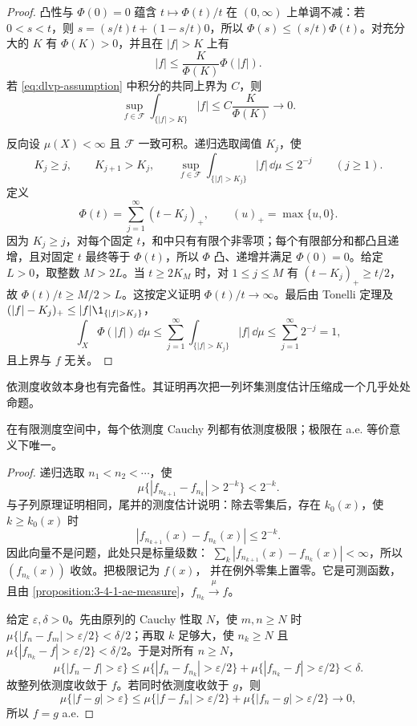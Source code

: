 \begin{proof}
凸性与 $\Phi(0)=0$ 蕴含 $t\mapsto\Phi(t)/t$ 在 $(0,\infty)$ 上单调不减：若
$0<s<t$，则 $s=(s/t)t+(1-s/t)0$，所以
$\Phi(s)\le(s/t)\Phi(t)$。对充分大的 $K$ 有 $\Phi(K)>0$，并且在 $|f|>K$ 上有
\[
  |f|\le \frac{K}{\Phi(K)}\Phi(|f|).
\]
若 \eqref{eq:dlvp-assumption} 中积分的共同上界为 $C$，则
\[
 \sup_{f\in\mathcal F}\int_{\{|f|>K\}}|f|
 \le C\frac{K}{\Phi(K)}\longrightarrow0.
\]

反向设 $\mu(X)<\infty$ 且 $\mathcal F$ 一致可积。递归选取阈值 $K_j$，使
\[
 K_j\ge j,\qquad K_{j+1}>K_j,
 \qquad
 \sup_{f\in\mathcal F}\int_{\{|f|>K_j\}}|f|\,\dd\mu\le2^{-j}
 \qquad(j\ge1).
\]
定义
\[
 \Phi(t)=\sum_{j=1}^{\infty}(t-K_j)_+,
 \qquad (u)_+=\max\{u,0\}.
 \tag{3.4.6}\label{eq:dlvp-construction}
\]
因为 $K_j\ge j$，对每个固定 $t$，和中只有有限个非零项；每个有限部分和都凸且递增，且对固定
$t$ 最终等于 $\Phi(t)$，所以 $\Phi$ 凸、递增并满足 $\Phi(0)=0$。给定 $L>0$，取整数
$M>2L$。当 $t\ge2K_M$ 时，对 $1\le j\le M$ 有
$(t-K_j)_+\ge t/2$，故 $\Phi(t)/t\ge M/2>L$。这按定义证明
$\Phi(t)/t\to\infty$。最后由
Tonelli 定理及 $(|f|-K_j)_+\le |f|\1_{\{|f|>K_j\}}$，
\[
 \int_X\Phi(|f|)\,\dd\mu
 \le\sum_{j=1}^{\infty}
      \int_{\{|f|>K_j\}}|f|\,\dd\mu
 \le\sum_{j=1}^{\infty}2^{-j}=1,
\]
且上界与 $f$ 无关。
\end{proof}

依测度收敛本身也有完备性。其证明再次把一列坏集测度估计压缩成一个几乎处处命题。

\begin{proposition}[依测度完备性]\label{proposition:3-4-1-4}
在有限测度空间中，每个依测度 Cauchy 列都有依测度极限；极限在 a.e. 等价意义下唯一。
\end{proposition}

\begin{proof}
递归选取 $n_1<n_2<\cdots$，使
\[
 \mu\{|f_{n_{k+1}}-f_{n_k}|>2^{-k}\}<2^{-k}.
 \tag{3.4.7}\label{eq:measure-cauchy-fast-subsequence}
\]
与子列原理证明相同，尾并的测度估计说明：除去零集后，存在 $k_0(x)$，使 $k\ge k_0(x)$ 时
\[
 |f_{n_{k+1}}(x)-f_{n_k}(x)|\le2^{-k}.
\]
因此向量不是问题，此处只是标量级数：
$\sum_k|f_{n_{k+1}}(x)-f_{n_k}(x)|<\infty$，所以 $(f_{n_k}(x))$ 收敛。把极限记为 $f(x)$，
并在例外零集上置零。它是可测函数，且由
\cref{proposition:3-4-1-ae-measure}，$f_{n_k}\xrightarrow{\mu}f$。

给定 $\varepsilon,\delta>0$。先由原列的 Cauchy 性取 $N$，使 $m,n\ge N$ 时
$\mu\{|f_n-f_m|>\varepsilon/2\}<\delta/2$；再取 $k$ 足够大，使 $n_k\ge N$ 且
$\mu\{|f_{n_k}-f|>\varepsilon/2\}<\delta/2$。于是对所有 $n\ge N$，
\[
 \mu\{|f_n-f|>\varepsilon\}
 \le\mu\{|f_n-f_{n_k}|>\varepsilon/2\}
   +\mu\{|f_{n_k}-f|>\varepsilon/2\}<\delta.
\]
故整列依测度收敛于 $f$。若同时依测度收敛于 $g$，则
\[
 \mu\{|f-g|>\varepsilon\}
 \le\mu\{|f-f_n|>\varepsilon/2\}
   +\mu\{|f_n-g|>\varepsilon/2\}\longrightarrow0,
\]
所以 $f=g$ a.e.
\end{proof}

